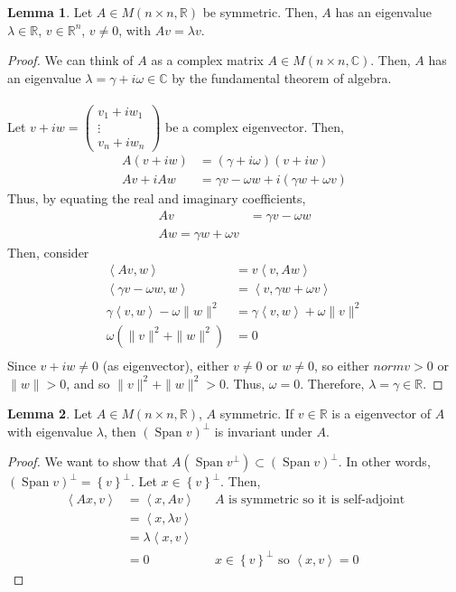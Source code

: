 \documentclass[letterpaper,12pt]{article}
\theoremstyle{definition}
\newtheorem*{lemma}{Lemma}
\newcommand{\set}[1]{\left\{ #1 \right\}}
\DeclareMathOperator{\Span}{Span}
\newcommand{\inp}[2]{\left< #1, #2 \right>}
\newcommand{\norm}[1]{\| #1 \|}
\begin{document}
\begin{lemma}
Let $A \in M(n \times n, \mathbb{R})$ be symmetric. Then, $A$ has an eigenvalue $\lambda \in \mathbb{R}$, $v \in \mathbb{R}^n$, $v \neq 0$, with $Av = \lambda v$.
\end{lemma}
\begin{proof}
We can think of $A$ as a complex matrix $A \in M(n \times n, \mathbb{C})$. Then, $A$ has an eigenvalue $\lambda = \gamma + i\omega \in \mathbb{C}$ by the fundamental theorem of algebra.
\\ \\ Let $v + iw = \begin{pmatrix} v_1 + i w_1 \\ \vdots \\ v_n + i w_n \end{pmatrix}$ be a complex eigenvector. Then,
\begin{align*}
    A(v+iw) & = (\gamma + i\omega)(v + iw) \\
    Av + iAw & = \gamma v - \omega w + i(\gamma w + \omega v)
\end{align*}
Thus, by equating the real and imaginary coefficients,
\begin{align*}
    Av & = \gamma v - \omega w \\
    Aw = \gamma w + \omega v
\end{align*}
Then, consider
\begin{align*}
    \inp{Av}{w} & = v \inp{v}{Aw} \\
    \inp{\gamma v - \omega w}{w} & = \inp{v}{\gamma w + \omega v} \\
    \gamma \inp{v}{w} - \omega \norm{w}^2 & = \gamma \inp{v}{w} + \omega \norm{v}^2 \\
    \omega(\norm{v}^2 + \norm{w}^2) & = 0 \\
\end{align*}
Since $v + iw \neq 0$ (as eigenvector), either $v \neq 0$ or $w \neq 0$, so either $norm{v} > 0$ or $\norm{w} > 0$, and so $\norm{v}^2 + \norm{w}^2 > 0$. Thus, $\omega = 0$. Therefore, $\lambda = \gamma \in \mathbb{R}$.
\end{proof}


\begin{lemma}
Let $A \in M(n \times n, \mathbb{R})$, $A$ symmetric. If $v \in \mathbb{R}$ is a eigenvector of $A$ with eigenvalue $\lambda$, then $(\Span{v})^{\perp}$ is invariant under $A$.
\end{lemma}
\begin{proof}
We want to show that $A(\Span{v}^{\perp}) \subset (\Span{v})^{\perp}$. In other words, $(\Span{v})^{\perp} = \set{v}^{\perp}$. Let $x \in \set{v}^{\perp}$. Then,
\begin{align*}
    \inp{Ax}{v} & = \inp{x}{Av} && \text{$A$ is symmetric so it is self-adjoint} \\
    & = \inp{x}{\lambda v} \\
    & = \lambda \inp{x}{v} \\
    & = 0 && \text{$x \in \set{v}^{\perp}$ so $\inp{x}{v} = 0$}
\end{align*}
\end{proof}
\end{document}
